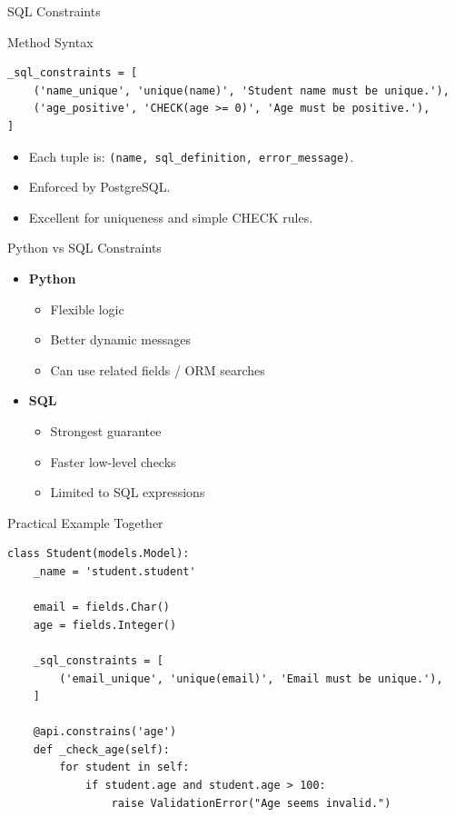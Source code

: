 \begin{frame}[fragile]{SQL Constraints}
\begin{block}{Method Syntax}
\begin{lstlisting}
_sql_constraints = [
	('name_unique', 'unique(name)', 'Student name must be unique.'),
	('age_positive', 'CHECK(age >= 0)', 'Age must be positive.'),
]
\end{lstlisting}
\end{block}
	\begin{itemize}
		\item Each tuple is: \texttt{(name, sql\_definition, error\_message)}.
		\item Enforced by PostgreSQL.
		\item Excellent for uniqueness and simple CHECK rules.
	\end{itemize}
\end{frame}

\begin{frame}[fragile]{Python vs SQL Constraints}
	\begin{itemize}
		\item \textbf{Python}
		\begin{itemize}
			\item Flexible logic
			\item Better dynamic messages
			\item Can use related fields / ORM searches
		\end{itemize}
		\item \textbf{SQL}
		\begin{itemize}
			\item Strongest guarantee
			\item Faster low-level checks
			\item Limited to SQL expressions
		\end{itemize}
	\end{itemize}
\end{frame}

\begin{frame}[fragile]{Practical Example Together}
\begin{lstlisting}
class Student(models.Model):
	_name = 'student.student'

	email = fields.Char()
	age = fields.Integer()

	_sql_constraints = [
		('email_unique', 'unique(email)', 'Email must be unique.'),
	]

	@api.constrains('age')
	def _check_age(self):
		for student in self:
			if student.age and student.age > 100:
				raise ValidationError("Age seems invalid.")
\end{lstlisting}
\end{frame}

